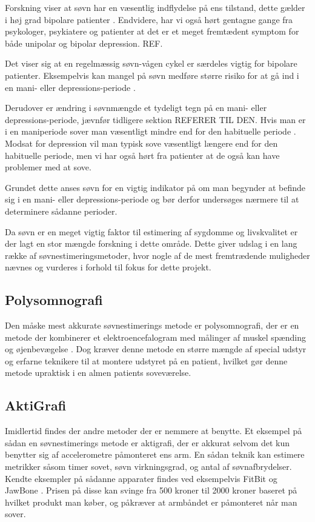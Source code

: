 Forskning viser at søvn har en væsentlig indflydelse på ens tilstand, dette gælder i høj grad bipolare patienter \citep{CPSP:CPSP1164}.
Endvidere, har vi også hørt gentagne gange fra psykologer, psykiatere og patienter at det er et meget fremtædent symptom for både unipolar og bipolar depression. REF.

Det viser sig at en regelmæssig søvn-vågen cykel er særdeles vigtig for bipolare patienter.
Eksempelvis kan mangel på søvn medføre større risiko for at gå ind i en mani- eller depressions-periode \citep{CPSP:CPSP1164}.

Derudover er ændring i søvnmængde et tydeligt tegn på en mani- eller depressions-periode, jævnfør tidligere sektion REFERER TIL DEN.
Hvis man er i en maniperiode sover man væsentligt mindre end for den habituelle periode \citep{CPSP:CPSP1164}.
Modsat for depression vil man typisk sove væsentligt længere end for den habituelle periode, men vi har også hørt fra patienter at de også kan have problemer med at sove.

Grundet dette anses søvn for en vigtig indikator på om man begynder at befinde sig i en mani- eller depressions-periode og bør derfor undersøges nærmere til at determinere sådanne perioder.

Da søvn er en meget vigtig faktor til estimering af sygdomme og livskvalitet er der lagt en stor mængde forskning i dette område.
Dette giver udslag i en lang række af søvnestimeringsmetoder, hvor nogle af de mest fremtrædende muligheder nævnes og vurderes i forhold til fokus for dette projekt.

\subsection{Polysomnografi}
Den måske mest akkurate søvnestimerings metode er polysomnografi, der er en metode der kombinerer et elektroencefalogram med målinger af muskel spænding og øjenbevægelse \citep{misc:polysomnografi,misc:polysomnography}.
Dog kræver denne metode en større mængde af special udstyr og erfarne teknikere til at montere udstyret på en patient, hvilket gør denne metode upraktisk i en almen patients soveværelse.

\subsection{AktiGrafi}
Imidlertid findes der andre metoder der er nemmere at benytte.
Et eksempel på sådan en søvnestimerings metode er aktigrafi, der er akkurat selvom det kun benytter sig af accelerometre påmonteret ens arm.
En sådan teknik kan estimere metrikker såsom timer sovet, søvn virkningsgrad, og antal af søvnafbrydelser.
Kendte eksempler på sådanne apparater findes ved eksempelvis FitBit og JawBone \citep{misc:fitbitSleepTracking,misc:jawBoneSleepTracking}.
Prisen på disse kan svinge fra 500 kroner til 2000 kroner baseret på hvilket produkt man køber, og påkræver at armbåndet er påmonteret når man sover.

